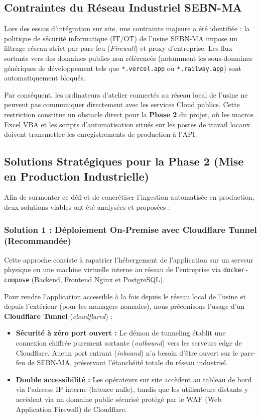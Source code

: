 \subsection{Contraintes du Réseau Industriel SEBN-MA}
Lors des essais d'intégration sur site, une contrainte majeure a été identifiée : la politique de sécurité informatique (IT/OT) de l'usine SEBN-MA impose un filtrage réseau strict par pare-feu (\textit{Firewall}) et proxy d'entreprise.
Les flux sortants vers des domaines publics non référencés (notamment les sous-domaines génériques de développement tels que \texttt{*.vercel.app} ou \texttt{*.railway.app}) sont automatiquement bloqués. 

Par conséquent, les ordinateurs d'atelier connectés au réseau local de l'usine ne peuvent pas communiquer directement avec les services Cloud publics. Cette restriction constitue un obstacle direct pour la \textbf{Phase 2} du projet, où les macros Excel VBA et les scripts d'automatisation situés sur les postes de travail locaux doivent transmettre les enregistrements de production à l'API.

\subsection{Solutions Stratégiques pour la Phase 2 (Mise en Production Industrielle)}
Afin de surmonter ce défi et de concrétiser l'ingestion automatisée en production, deux solutions viables ont été analysées et proposées :

\subsubsection{Solution 1 : Déploiement On-Premise avec Cloudflare Tunnel (Recommandée)}
Cette approche consiste à rapatrier l'hébergement de l'application sur un serveur physique ou une machine virtuelle interne au réseau de l'entreprise via \texttt{docker-compose} (Backend, Frontend Nginx et PostgreSQL). 

Pour rendre l'application accessible à la fois depuis le réseau local de l'usine et depuis l'extérieur (pour les managers nomades), nous préconisons l'usage d'un \textbf{Cloudflare Tunnel} (\textit{cloudflared}) :
\begin{itemize}
    \item \textbf{Sécurité à zéro port ouvert :} Le démon de tunneling établit une connexion chiffrée purement sortante (\textit{outbound}) vers les serveurs edge de Cloudflare. Aucun port entrant (\textit{inbound}) n'a besoin d'être ouvert sur le pare-feu de SEBN-MA, préservant l'étanchéité totale du réseau industriel.
    \item \textbf{Double accessibilité :} Les opérateurs sur site accèdent au tableau de bord via l'adresse IP interne (latence nulle), tandis que les utilisateurs distants y accèdent via un domaine public sécurisé protégé par le WAF (Web Application Firewall) de Cloudflare.
\end{itemize}


